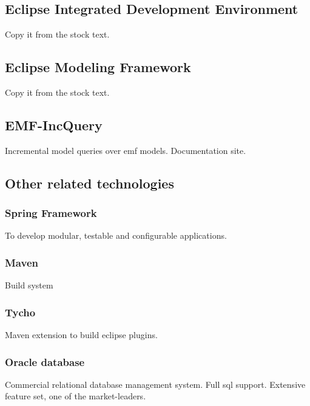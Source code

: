 \subsection{Eclipse Integrated Development Environment}
Copy it from the stock text.


\subsection{Eclipse Modeling Framework}
Copy it from the stock text.

\subsection{EMF-IncQuery} 
Incremental model queries over emf models. Documentation site.



\subsection{Other related technologies}

\subsubsection{Spring Framework}
To develop modular, testable and configurable applications.
\subsubsection{Maven}
Build system
\subsubsection{Tycho}
Maven extension to build eclipse plugins.
\subsubsection{Oracle database}
Commercial relational database management system. Full sql support. Extensive
feature set, one of the market-leaders.

